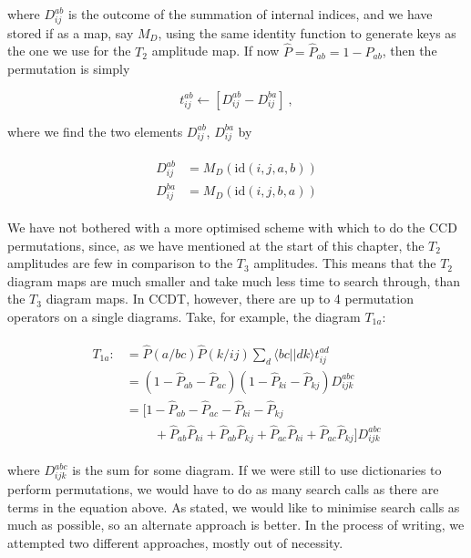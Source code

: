 	where $D_{ij}^{ab}$ is the outcome of the summation of internal indices, and we have stored if as a map, say $M_D$, using the same identity function to generate keys as the one we use for the $T_2$ amplitude map. If now $\hat{P} = \hat{P}_{ab} = 1-P_{ab}$, then the permutation is simply
	
	\begin{equation}
		t_{ij}^{ab} \leftarrow \left[D_{ij}^{ab} - D_{ij}^{ba}\right] \:,
	\end{equation}
	
	where we find the two elements $D_{ij}^{ab}$, $D_{ij}^{ba}$ by
	
	\begin{align}
		\begin{split}
		D_{ij}^{ab} &= M_D\left(\text{id}(i,j,a,b)\right) \\
		D_{ij}^{ba} &= M_D\left(\text{id}(i,j,b,a)\right)
		\end{split}
	\end{align}
	
	We have not bothered with a more optimised scheme with which to do the CCD permutations, since, as we have mentioned at the start of this chapter, the $T_2$ amplitudes are few in comparison to the $T_3$ amplitudes. This means that the $T_2$ diagram maps are much smaller and take much less time to search through, than the $T_3$ diagram maps. In CCDT, however, there are up to 4 permutation operators on a single diagrams. Take, for example, the diagram $T_{1a}$:
	
	\begin{align}
		\begin{split}
		T_{1a} :&= \hat{P}(a/bc)\hat{P}(k/ij)\sum_d \langle bc|| dk\rangle t_{ij}^{ad} \\
		& = (1-\hat{P}_{ab} - \hat{P}_{ac})(1-\hat{P}_{ki}-\hat{P}_{kj})D_{ijk}^{abc} \\
		&= \big[1-\hat{P}_{ab}-\hat{P}_{ac}-\hat{P}_{ki}-\hat{P}_{kj} \\
		&\quad\quad\: + \hat{P}_{ab}\hat{P}_{ki} + \hat{P}_{ab}\hat{P}_{kj} + \hat{P}_{ac}\hat{P}_{ki} + \hat{P}_{ac}\hat{P}_{kj} \big]D_{ijk}^{abc}
		\end{split}
	\end{align}
	
	where $D_{ijk}^{abc}$ is the sum for some diagram. If we were still to use dictionaries to perform permutations, we would have to do as many search calls as there are terms in the equation above. As stated, we would like to minimise search calls as much as possible, so an alternate approach is better. In the process of writing, we attempted two different approaches, mostly out of necessity.\\
	
